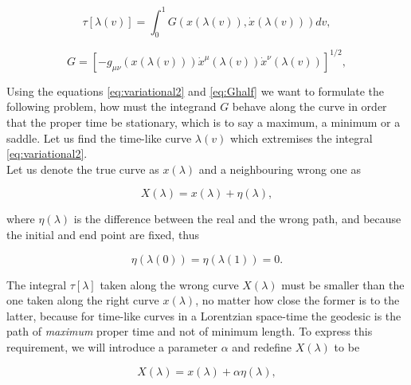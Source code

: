         \begin{equation}\label{eq:variational2}
            \tau\left[\lambda(v)\right] = \int_0^1 G\left(x\left(\lambda(v)\right), \Dot{x}\left(\lambda\left(v\right)\right)\right)dv,
        \end{equation}

        \begin{equation}\label{eq:Ghalf}
            G = \left[-g_{\mu\nu}\left(x\left(\lambda(v)\right)\right)\Dot{x}^{\mu}\left(\lambda(v)\right)\Dot{x}^{\nu}\left(\lambda(v)\right)\right]^{1/2},
        \end{equation}

        Using the equations \ref{eq:variational2} and \ref{eq:Ghalf} we want to formulate the following problem, how must the integrand $G$ behave along the curve in order that the proper time be stationary, which is to say a maximum, a minimum or a saddle. Let us find the time-like curve $\lambda(v)$ which extremises the integral \ref{eq:variational2}.\\

        Let us denote the true curve as $x(\lambda)$ and a neighbouring wrong one as 

        \begin{equation}
            X(\lambda) = x(\lambda) + \eta(\lambda),
        \end{equation}

        where $\eta(\lambda)$ is the difference between the real and the wrong path, and because the initial and end point are fixed, thus

        \begin{equation}
            \eta\left(\lambda(0) \right) = \eta\left(\lambda(1) \right) = 0.
        \end{equation}

        The integral $\tau\left[\lambda\right]$ taken along the wrong curve $X(\lambda)$ must be smaller than the one taken along the right curve $x(\lambda)$, no matter how close the former is to the latter, because for time-like curves in a Lorentzian space-time the geodesic is the path of \textit{maximum} proper time and not of minimum length. To express this requirement, we will introduce a parameter $\alpha$ and redefine $X(\lambda)$ to be

        \begin{equation}\label{eq:alphaeta}
            X(\lambda) = x(\lambda) + \alpha\eta(\lambda),
        \end{equation}

